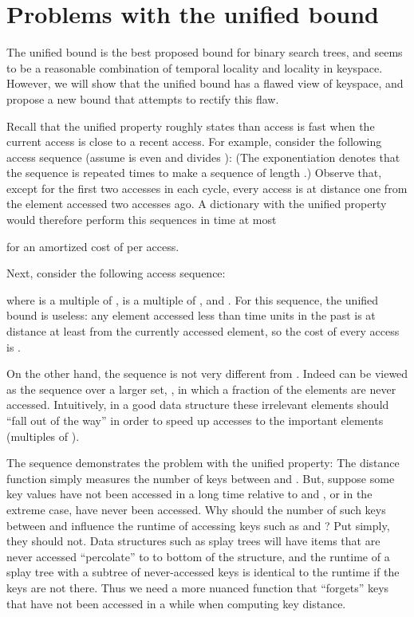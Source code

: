 \documentclass{llncs}
\begin{document}
\section{Problems with the unified bound}

The unified bound is the best proposed bound for binary search trees, and seems to be a reasonable combination of temporal locality and locality in keyspace. However, we will show that the unified bound has a flawed view of keyspace, and propose a new bound that attempts to rectify this flaw.

Recall that the unified property roughly states than access is fast when the current access is close to a recent access. For example, consider the following access sequence (assume  is even and  divides ): 
(The exponentiation denotes that the sequence is repeated  times
to make a sequence of length .)
Observe that, except for the first two accesses in each cycle, every access is at distance one from the element accessed two accesses ago.  A dictionary with the unified
property would therefore perform this sequences in time at most

for an amortized cost of  per access.  

Next, consider the following access sequence:

where  is a multiple of ,  is a multiple of , and . For this sequence, the unified bound is useless: any element accessed less than  time units in the past is at distance at least  from the currently accessed element, so the cost of every access is .

On the other hand, the sequence  is not very different from .  Indeed  can be viewed as the sequence  over a larger set, , in which a  fraction of the elements are never accessed.  Intuitively, in a good data structure these irrelevant elements should ``fall out of the way'' in order to speed up accesses to the important elements (multiples of ).



The sequence  demonstrates the problem with the unified property: The distance function  simply measures the number of keys between  and . But, suppose some key values have not been accessed in a long time relative to  and , or in the extreme case, have never been accessed. Why should the number of such keys between  and  influence the runtime of accessing keys such as  and ?
Put simply, they should not. Data structures such as splay trees will have items that are never accessed ``percolate'' to to bottom of the structure, and the runtime of a splay tree with a subtree of never-accessed keys is identical to the runtime if the keys are not there. Thus we need a more nuanced  function that ``forgets'' keys that have not been accessed in a while when computing key distance.
\end{document}

